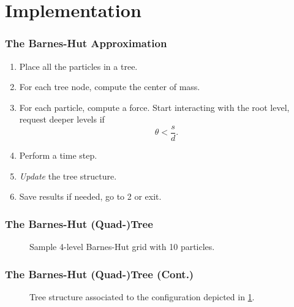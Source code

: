 \section{Implementation}

\begin{frame}
	\frametitle{The Barnes-Hut Approximation}
	\begin{enumerate}
		\item Place all the particles in a tree.
		\item For each tree node, compute the center of mass.
		\item For each particle, compute a force. Start interacting with the root level, request deeper levels if
		$$\theta<\frac{s}{d}.$$
		\item Perform a time step.
		\item \emph{Update} the tree structure.
		\item Save results if needed, go to 2 or exit.
	\end{enumerate}
\end{frame}

\begin{frame}
	\frametitle{The Barnes-Hut (Quad-)Tree}
	\begin{figure}
		\centering
		\begin{tikzpicture}[scale=0.05,%
		every circle node/.style = {width=3,fill=black}]
		
		\end{tikzpicture}
		\caption{Sample 4-level Barnes-Hut grid with 10 particles.}
		\label{fig:bh-grid}
	\end{figure}
\end{frame}

\begin{frame}
	\frametitle{The Barnes-Hut (Quad-)Tree (Cont.)}
	\begin{figure}
		\centering
		\newlength{\lvld}
		\setlength{\lvld}{7em}
		\begin{tikzpicture}[level distance=3em,
		sibling distance=3em,
		level 1/.style={sibling distance=0.80\lvld},
		level 2/.style={sibling distance=0.40\lvld},
		level 3/.style={sibling distance=0.4\lvld},
		level 4/.style={sibling distance=0.25\lvld},
		every node/.style = {shape=circle, draw, align=center, color=black,
			fill=white, scale=0.75}]
		
		\end{tikzpicture}
		\caption{Tree structure associated to the configuration depicted in \cref{fig:bh-grid}.}
	\end{figure}
\end{frame}

